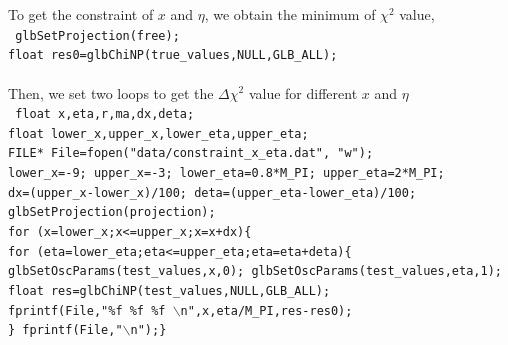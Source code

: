 \documentclass[aps,prd,nofootinbib,preprint]{revtex4}
\begin{document}
To get the constraint of $x$ and $\eta$, we obtain the minimum of $\chi^2$ value,\vspace{0.2cm}\\
\texttt{
    glbSetProjection(free);\\
    float res0=glbChiNP(true\_values,NULL,GLB\_ALL);\\ } \vspace{0.2cm}\\
%
Then, we set two loops to get the $\Delta \chi^2$ value for different $x$ and $\eta$\vspace{0.2cm}\\
%
\texttt{     float x,eta,r,ma,dx,deta;\\
     float lower\_x,upper\_x,lower\_eta,upper\_eta;\\
     FILE* File=fopen("data/constraint\_x\_eta.dat", "w");\\
    lower\_x=-9; upper\_x=-3; lower\_eta=0.8*M\_PI; upper\_eta=2*M\_PI;\\
    dx=(upper\_x-lower\_x)/100; deta=(upper\_eta-lower\_eta)/100;\\
        glbSetProjection(projection);\\
   for (x=lower\_x;x<=upper\_x;x=x+dx)\{ \\
    for (eta=lower\_eta;eta<=upper\_eta;eta=eta+deta)\{\\
     glbSetOscParams(test\_values,x,0); glbSetOscParams(test\_values,eta,1);\\
        float res=glbChiNP(test\_values,NULL,GLB\_ALL);\\
            fprintf(File,"\%f \%f  \%f $\backslash$n",x,eta/M\_PI,res-res0);\\
                     \} fprintf(File,"$\backslash$n");\}\\
}
\end{document}
